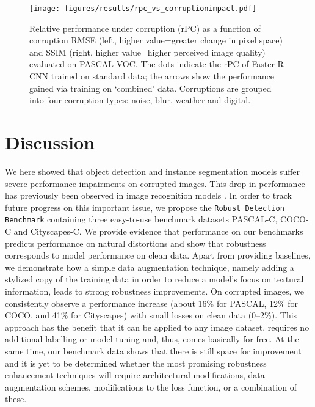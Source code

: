 \documentclass{article}
\begin{document}
\begin{figure}[ht]
    \centering
    \texttt{[image: figures/results/rpc\_vs\_corruptionimpact.pdf]}
    \caption{Relative performance under corruption (rPC) as a function of corruption RMSE (left, higher value=greater change in pixel space) and SSIM (right, higher value=higher perceived image quality) evaluated on PASCAL VOC. The dots indicate the rPC of Faster R-CNN trained on standard data; the arrows show the performance gained via training on `combined' data. Corruptions are grouped into four corruption types: noise, blur, weather and digital.}
    \label{fig:dAcc_rmse}
\end{figure}{} \section{Discussion}
  \label{Discussion}

We here showed that object detection and instance segmentation models suffer severe performance impairments on corrupted images. This drop in performance has previously been observed in image recognition models \citep[e.g.][]{Geirhos2018generalisation, hendrycks2018benchmarking}. In order to track future progress on this important issue, we propose the \texttt{Robust Detection Benchmark} containing three easy-to-use benchmark datasets PASCAL-C, COCO-C and Cityscapes-C. We provide evidence that performance on our benchmarks predicts performance on natural distortions and show that robustness corresponds to model performance on clean data. Apart from providing baselines, we demonstrate how a simple data augmentation technique, namely adding a stylized copy of the training data in order to reduce a model's focus on textural information, leads to strong robustness improvements. On corrupted images, we consistently observe a performance increase (about 16\% for PASCAL, 12\% for COCO, and 41\% for Cityscapes) with small losses on clean data (0--2\%). This approach has the benefit that it can be applied to any image dataset, requires no additional labelling or model tuning and, thus, comes basically for free. At the same time, our benchmark data shows that there is still space for improvement and it is yet to be determined whether the most promising robustness enhancement techniques will require architectural modifications, data augmentation schemes, modifications to the loss function, or a combination of these.
\end{document}

